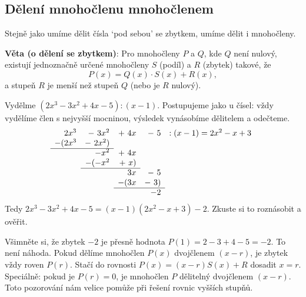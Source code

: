 \subsection{Dělení mnohočlenu mnohočlenem}\label{sec:deleni-mnohoclenu}

Stejně jako umíme dělit čísla `pod sebou' se zbytkem, umíme dělit i mnohočleny.

\begin{definitionbox}
  \textbf{Věta (o dělení se zbytkem)}: Pro mnohočleny $P$ a $Q$, kde $Q$ není nulový, existují jednoznačně určené mnohočleny $S$ (podíl) a $R$ (zbytek) takové, že
  \begin{equation*}
    P(x) = Q(x)\cdot S(x) + R(x),
  \end{equation*}
  a stupeň $R$ je menší než stupeň $Q$ (nebo je $R$ nulový).
\end{definitionbox}

\begin{example}
  Vydělme $(2x^3 - 3x^2 + 4x - 5) : (x - 1)$. Postupujeme jako u čísel: vždy vydělíme člen s nejvyšší mocninou, výsledek vynásobíme dělitelem a odečteme.
  \shorthandoff{-}%
  \begin{equation*}
    \begin{array}{rrrrl}
      2x^3 & -\ 3x^2 & +\ 4x & -\ 5 & : (x - 1) = 2x^2 - x + 3\\
      -(2x^3 & -\ 2x^2) & & & \\ \cline{1-2}
      & -x^2 & +\ 4x & & \\
      & -(-x^2 & +\ x) & & \\ \cline{2-3}
      & & 3x & -\ 5 & \\
      & & -(3x & -\ 3) & \\ \cline{3-4}
      & & & -2 &
    \end{array}
  \end{equation*}
  Tedy $2x^3 - 3x^2 + 4x - 5 = (x - 1)(2x^2 - x + 3) - 2$. Zkuste si to roznásobit a ověřit.
\end{example}

\begin{note}
  Všimněte si, že zbytek $-2$ je přesně hodnota $P(1) = 2 - 3 + 4 - 5 = -2$. To není náhoda. Pokud dělíme mnohočlen $P(x)$ dvojčlenem $(x - r)$, je zbytek vždy roven $P(r)$. Stačí do rovnosti $P(x) = (x - r)S(x) + R$ dosadit $x = r$. Speciálně: pokud je $P(r) = 0$, je mnohočlen $P$ dělitelný dvojčlenem $(x - r)$. Toto pozorování nám velice pomůže při řešení rovnic vyšších stupňů.
\end{note}

